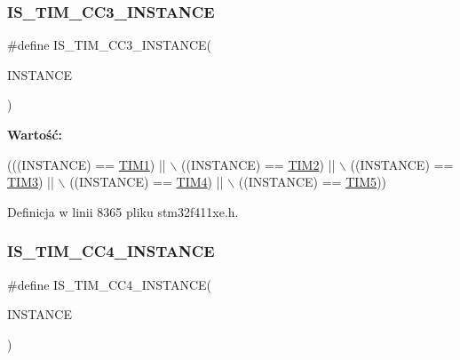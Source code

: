 \subsubsection{\texorpdfstring{I\+S\+\_\+\+T\+I\+M\+\_\+\+C\+C3\+\_\+\+I\+N\+S\+T\+A\+N\+CE}{IS\_TIM\_CC3\_INSTANCE}}
{\footnotesize\ttfamily \#define I\+S\+\_\+\+T\+I\+M\+\_\+\+C\+C3\+\_\+\+I\+N\+S\+T\+A\+N\+CE(\begin{DoxyParamCaption}\item[{}]{I\+N\+S\+T\+A\+N\+CE }\end{DoxyParamCaption})}

{\bfseries Wartość\+:}
\begin{DoxyCode}
(((INSTANCE) == \hyperlink{group___peripheral__declaration_ga2e87451fea8dc9380056d3cfc5ed81fb}{TIM1}) || \(\backslash\)
                                         ((INSTANCE) == \hyperlink{group___peripheral__declaration_ga3cfac9f2e43673f790f8668d48b4b92b}{TIM2}) || \(\backslash\)
                                         ((INSTANCE) == \hyperlink{group___peripheral__declaration_ga61ee4c391385607d7af432b63905fcc9}{TIM3}) || \(\backslash\)
                                         ((INSTANCE) == \hyperlink{group___peripheral__declaration_ga91a09bad8bdc7a1cb3d85cf49c94c8ec}{TIM4}) || \(\backslash\)
                                         ((INSTANCE) == \hyperlink{group___peripheral__declaration_ga5125ff6a23a2ed66e2e19bd196128c14}{TIM5}))
\end{DoxyCode}


Definicja w linii 8365 pliku stm32f411xe.\+h.

\mbox{\label{group___exported__macros_gae72b7182a73d81c33196265b31091c07}} 
\subsubsection{\texorpdfstring{I\+S\+\_\+\+T\+I\+M\+\_\+\+C\+C4\+\_\+\+I\+N\+S\+T\+A\+N\+CE}{IS\_TIM\_CC4\_INSTANCE}}
{\footnotesize\ttfamily \#define I\+S\+\_\+\+T\+I\+M\+\_\+\+C\+C4\+\_\+\+I\+N\+S\+T\+A\+N\+CE(\begin{DoxyParamCaption}\item[{}]{I\+N\+S\+T\+A\+N\+CE }\end{DoxyParamCaption})}

